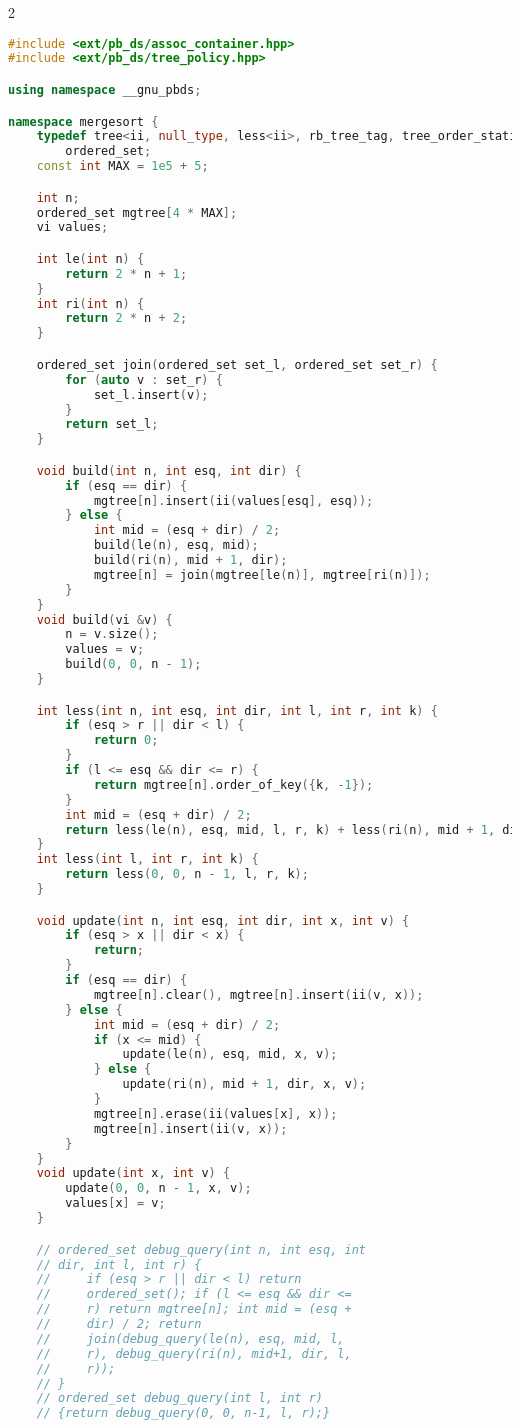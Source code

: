 \documentclass[11pt, a4paper, oneside]{book}
\begin{document}
\begin{multicols}{2}
\begin{lstlisting}[language=C++]
#include <ext/pb_ds/assoc_container.hpp>
#include <ext/pb_ds/tree_policy.hpp>

using namespace __gnu_pbds;

namespace mergesort {
    typedef tree<ii, null_type, less<ii>, rb_tree_tag, tree_order_statistics_node_update>
        ordered_set;
    const int MAX = 1e5 + 5;

    int n;
    ordered_set mgtree[4 * MAX];
    vi values;

    int le(int n) {
        return 2 * n + 1;
    }
    int ri(int n) {
        return 2 * n + 2;
    }

    ordered_set join(ordered_set set_l, ordered_set set_r) {
        for (auto v : set_r) {
            set_l.insert(v);
        }
        return set_l;
    }

    void build(int n, int esq, int dir) {
        if (esq == dir) {
            mgtree[n].insert(ii(values[esq], esq));
        } else {
            int mid = (esq + dir) / 2;
            build(le(n), esq, mid);
            build(ri(n), mid + 1, dir);
            mgtree[n] = join(mgtree[le(n)], mgtree[ri(n)]);
        }
    }
    void build(vi &v) {
        n = v.size();
        values = v;
        build(0, 0, n - 1);
    }

    int less(int n, int esq, int dir, int l, int r, int k) {
        if (esq > r || dir < l) {
            return 0;
        }
        if (l <= esq && dir <= r) {
            return mgtree[n].order_of_key({k, -1});
        }
        int mid = (esq + dir) / 2;
        return less(le(n), esq, mid, l, r, k) + less(ri(n), mid + 1, dir, l, r, k);
    }
    int less(int l, int r, int k) {
        return less(0, 0, n - 1, l, r, k);
    }

    void update(int n, int esq, int dir, int x, int v) {
        if (esq > x || dir < x) {
            return;
        }
        if (esq == dir) {
            mgtree[n].clear(), mgtree[n].insert(ii(v, x));
        } else {
            int mid = (esq + dir) / 2;
            if (x <= mid) {
                update(le(n), esq, mid, x, v);
            } else {
                update(ri(n), mid + 1, dir, x, v);
            }
            mgtree[n].erase(ii(values[x], x));
            mgtree[n].insert(ii(v, x));
        }
    }
    void update(int x, int v) {
        update(0, 0, n - 1, x, v);
        values[x] = v;
    }

    // ordered_set debug_query(int n, int esq, int
    // dir, int l, int r) {
    //     if (esq > r || dir < l) return
    //     ordered_set(); if (l <= esq && dir <=
    //     r) return mgtree[n]; int mid = (esq +
    //     dir) / 2; return
    //     join(debug_query(le(n), esq, mid, l,
    //     r), debug_query(ri(n), mid+1, dir, l,
    //     r));
    // }
    // ordered_set debug_query(int l, int r)
    // {return debug_query(0, 0, n-1, l, r);}


\end{lstlisting}
\end{multicols}
\end{document}
